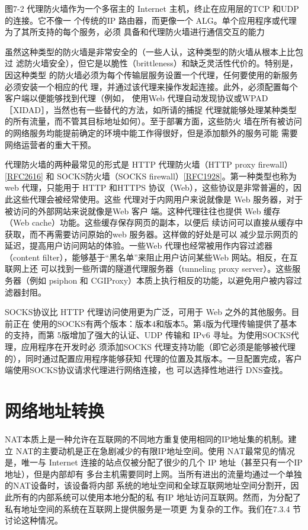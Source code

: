 图7-2 代理防火墙作为一个多宿主的 Internet 主机，终止在应用层的TCP 和UDP 的连接。它不像一
个传统的IP 路由器，而更像一个 ALG。单个应用程序或代理为了其所支持的每个服务，必须
具备和代理防火墙进行通信交互的能力

虽然这种类型的防火墙是非常安全的（一些人认，这种类型的防火墙从根本上比包过
滤防火墙安全），但它是以脆性（brittleness）和缺乏灵活性代价的。特别是，因这种类型
的防火墙必须为每个传输层服务设置一个代理，任何要使用的新服务必须安装一个相应的代
理，并通过该代理来操作发起连接。此外，必须配置每个客户端以便能够找到代理（例如，
使用Web 代理自动发现协议或WPAD［XIDAD］，当然也有一些替代的方法，如所请的捕捉
代理就能够处理某种类型的所有流量，而不管其目标地址如何）。至于部署方面，这些防火
墙在所有被访问的网络服务均能提前确定的环境中能工作得很好，但是添加额外的服务可能
需要网络运营者的重大干预。

代理防火墙的两种最常见的形式是 HTTP 代理防火墙（HTTP proxy firewall） \href{https://www.rfc-editor.org/rfc/rfc2616}{[RFC2616]}
和 SOCKS防火墙（SOCKS firewall）\href{https://www.rfc-editor.org/rfc/rfc1928}{[RFC1928]}。第一种类型也称为 web 代理，只能用于
HTTP 和HTTPS 协议（Web），这些协议是非常普遍的，因此这些代理会被经常使用。这些
代理对于内网用户来说就像是 Web 服务器，对于被访问的外部网站来说就像是Web 客户
端。这种代理往往也提供 Web 缓存（Web cache）功能。这些缓存保存网页的副本，以便后
续访问可以直接从缓存中获取，而不再需要访问原始的web 服务器。这样做的好处是可以
减少显示网页的延迟，提高用户访问网站的体验。一些Web 代理也经常被用作内容过滤器
（content filter），能够基于“黑名单”来阻止用户访问某些Web 网站。相反，在互联网上还
可以找到一些所谓的隧道代理服务器（tunneling proxy server）。这些服务器（例如 psiphon 和
CGIProxy）本质上执行相反的功能，以避免用户被内容过滤器封阻。

SOCKS协议比 HTTP 代理访问使用更为广泛，可用于 Web 之外的其他服务。目前正在
使用的SOCKS有两个版本：版本4和版本5。第4版为代理传输提供了基本的支持，而第
5版增加了强大的认证、UDP 传输和 IPv6 寻址。为使用SOCKS代理，应用程序在开发时必
须添加SOCKS 代理支持功能（即它必须是能够被代理的），同时通过配置应用程序能够获知
代理的位置及其版本。一旦配置完成，客户端使用SOCKS协议请求代理进行网络连接，也
可以选择性地进行 DNS查找。

\section{网络地址转换}

NAT本质上是一种允许在互联网的不同地方重复使用相同的IP地址集的机制。建立
NAT的主要动机是正在急剧减少的有限IP地址空间。使用 NAT最常见的情况是，唯一与
Internet 连接的站点仅被分配了很少的几个 IP 地址（甚至只有一个IP地址），但是内部却有
多台主机需要同时上网。当所有进出的流量均通过一个单独的NAT设备时，该设备将内部
系统的地址空间和全球互联网地址空间分割开，因此所有的内部系统可以使用本地分配的私
有IP 地址访问互联网。然而，为分配了私有地址空间的系统在互联网上提供服务是一项更
为复杂的工作。我们在7.3.4 节讨论这种情况。

